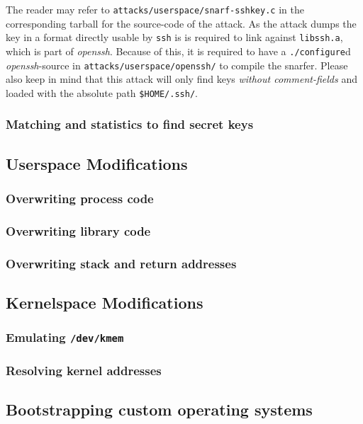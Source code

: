 The reader may refer to \texttt{attacks/userspace/snarf-sshkey.c} in the
corresponding tarball for the source-code of the attack. As the attack dumps the
key in a format directly usable by \texttt{ssh} is is required to link against
\texttt{libssh.a}, which is part of \emph{openssh}. Because of this, it is
required to have a \texttt{./configure}d \emph{openssh}-source in
\texttt{attacks/userspace/openssh/} to compile the snarfer. Please also keep in
mind that this attack will only find keys \emph{without comment-fields} and
loaded with the absolute path \texttt{\$HOME/.ssh/}.

\subsubsection{Matching and statistics to find secret keys}




\subsection{Userspace Modifications}

\subsubsection{Overwriting process code}

\subsubsection{Overwriting library code}

\subsubsection{Overwriting stack and return addresses}




\subsection{Kernelspace Modifications}

\subsubsection{Emulating \texttt{/dev/kmem}}

\subsubsection{Resolving kernel addresses}





\subsection{Bootstrapping custom operating systems}



